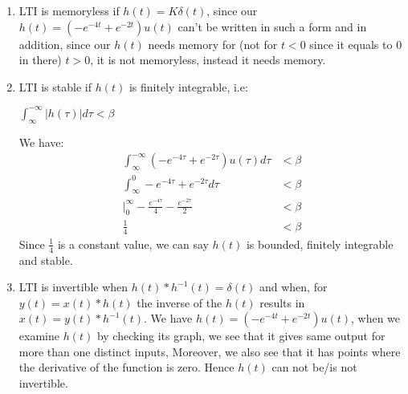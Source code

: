 \documentclass[10pt,a4paper, margin=1in]{article}
\begin{document}
\begin{enumerate}
\begin{enumerate}
\begin{enumerate}
        \item
        LTI is memoryless if $h(t)=K\delta(t)$, since our $h(t)=(-e^{-4t}+e^{-2t})u(t)$ can't be written in such a form and in addition, since our $h(t)$ needs memory for (not for $t<0$ since it equals to 0 in there) $t>0$, it is not memoryless, instead it needs memory. \\
        \item
        LTI is stable if $h(t)$ is finitely integrable, i.e:
        \begin{center}
        $\int_{\infty}^{-\infty}|h(\tau)|d\tau < \beta$
        \end{center}
        We have:
        \begin{align*}
        \int_{\infty}^{-\infty}(-e^{-4\tau}+e^{-2\tau})u(\tau)d\tau &< \beta \\
        \int_{\infty}^{0}-e^{-4\tau}+e^{-2\tau}d\tau &< \beta \\
        |_0^{\infty}-\frac{e^{-4\tau}}{4} - \frac{e^{-2\tau}}{2} &< \beta \\
        \frac{1}{4} &< \beta
        \end{align*}
        Since $\frac{1}{4}$ is a constant value, we can say $h(t)$ is bounded, finitely integrable and stable. \\
        \item
        LTI is invertible when $h(t)*h^{-1}(t)=\delta(t)$ and when, for $y(t)=x(t)*h(t)$ the inverse of the $h(t)$ results in $x(t)=y(t)*h^{-1}(t)$. We have $h(t)=(-e^{-4t}+e^{-2t})u(t)$, when we examine $h(t)$ by checking its graph, we see that it gives same output for more than one distinct inputs, Moreover, we also see that it has points where the derivative of the function is zero. Hence $h(t)$ can not be/is not invertible.
    	\end{enumerate}
    \end{enumerate}

\end{enumerate}
\end{document}
